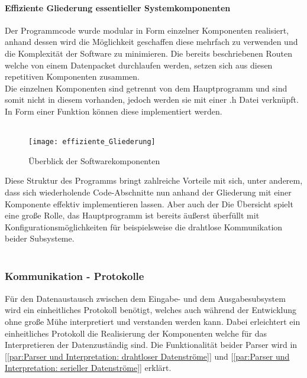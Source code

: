 \documentclass[titlepage,12pt,twoside]{article}
\begin{document}
\paragraph{Effiziente Gliederung essentieller Systemkomponenten}
\label{par:Effiziente Gliederung essentieller Systemkomponenten}
\hfill \break
\hfill \break
Der Programmcode wurde modular in Form einzelner Komponenten realisiert, anhand dessen wird die Möglichkeit geschaffen diese mehrfach zu verwenden und 
die Komplexität der Software zu minimieren. Die bereits beschriebenen Routen welche von einem Datenpacket durchlaufen werden, setzen sich aus diesen 
repetitiven Komponenten zusammen. \\
Die einzelnen Komponenten sind getrennt von dem Hauptprogramm und sind somit nicht in diesem vorhanden, jedoch werden sie mit einer .h Datei verknüpft. 
In Form einer Funktion können diese implementiert werden. \\
\\
\begin{figure}[H]
	\begin{center}
		\scalebox{1}
		{\texttt{[image: effiziente\_Gliederung]}}
		\caption{Überblick der Softwarekomponenten}
		\label{fig:effiziente_Gliederung}		
	\end{center}
\end{figure}
\hfill \break
Diese Struktur des Programms bringt zahlreiche Vorteile mit sich, unter anderem, dass sich wiederholende Code-Abschnitte nun anhand der Gliederung mit 
einer Komponente effektiv implementieren lassen. Aber auch der Die Übersicht spielt eine große Rolle, das Hauptprogramm ist bereits äußerst überfüllt 
mit Konfigurationsmöglichkeiten für beispielsweise die drahtlose Kommunikation beider Subsysteme. \\
\\

\subsubsection{Kommunikation - Protokolle}
\label{chap:Kommunikation-Protokolle}
Für den Datenaustausch zwischen dem Eingabe- und dem Ausgabesubsystem wird ein einheitliches Protokoll benötigt, welches auch während der Entwicklung 
ohne große Mühe interpretiert und verstanden werden kann. Dabei erleichtert ein einheitliches Protokoll die Realisierung der Komponenten welche für das 
Interpretieren der Datenzuständig sind. Die Funktionalität beider Parser wird in [\textcolor{blue}{\autoref{par:Parser und Interpretation: drahtloser Datenströme}}]
und [\textcolor{blue}{\autoref{par:Parser und Interpretation: serieller Datenströme}}] erklärt. \\
\\
\end{document}
